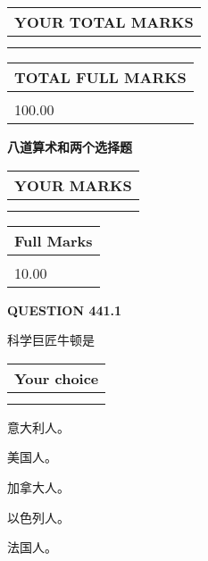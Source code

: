 \documentclass{ctexart}
\begin{document}
   
\vspace{0.2in}\noindent\begin{tabular}{|l|}
\hline
YOUR TOTAL MARKS  \\
\hline
 \\ 
 \\ 
\hline
\end{tabular}
\hspace{0.05in} \begin{tabular}{|l|}
\hline
TOTAL FULL MARKS  \\
\hline
 \\ 
100.00 \\
\hline
\end{tabular}
   
   
 \vspace{0.2in}
{\LARGE {\textbf{ 八道算术和两个选择题}}}
   
   
  
\vspace{0.2in}
  
\noindent\begin{tabular}{|l|}
\hline
 YOUR MARKS  \\
\hline
 \\ 
 \\ 
\hline
\end{tabular}
\hspace{0.05in} \begin{tabular}{|l|}
\hline
 Full Marks  \\
\hline
 \\ 
10.00 \\
\hline
\end{tabular}
{\textbf{\Large{QUESTION
441.1 
}}}
  
  
科学巨匠牛顿是
  
  
\noindent\hspace{3.0in} \begin{tabular}{|l|}
\hline
Your choice \\
\hline
 \\ 
 \\ 
\hline
\end{tabular}
  
  
 
 
意大利人。
 
 
美国人。
 
 
加拿大人。
 
 
以色列人。
 
 
法国人。
 
\end{document}
